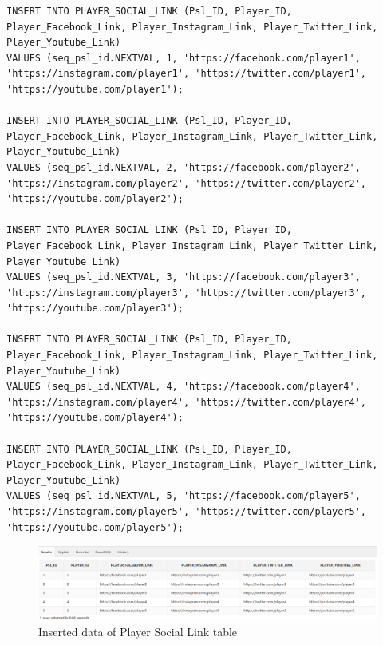\begin{lstlisting}[caption={Inserting data into Player\_SocialLink tables},label={lst:insert_Player_SocialLink}]
INSERT INTO PLAYER_SOCIAL_LINK (Psl_ID, Player_ID, Player_Facebook_Link, Player_Instagram_Link, Player_Twitter_Link, Player_Youtube_Link)
VALUES (seq_psl_id.NEXTVAL, 1, 'https://facebook.com/player1', 'https://instagram.com/player1', 'https://twitter.com/player1', 'https://youtube.com/player1');

INSERT INTO PLAYER_SOCIAL_LINK (Psl_ID, Player_ID, Player_Facebook_Link, Player_Instagram_Link, Player_Twitter_Link, Player_Youtube_Link)
VALUES (seq_psl_id.NEXTVAL, 2, 'https://facebook.com/player2', 'https://instagram.com/player2', 'https://twitter.com/player2', 'https://youtube.com/player2');

INSERT INTO PLAYER_SOCIAL_LINK (Psl_ID, Player_ID, Player_Facebook_Link, Player_Instagram_Link, Player_Twitter_Link, Player_Youtube_Link)
VALUES (seq_psl_id.NEXTVAL, 3, 'https://facebook.com/player3', 'https://instagram.com/player3', 'https://twitter.com/player3', 'https://youtube.com/player3');

INSERT INTO PLAYER_SOCIAL_LINK (Psl_ID, Player_ID, Player_Facebook_Link, Player_Instagram_Link, Player_Twitter_Link, Player_Youtube_Link)
VALUES (seq_psl_id.NEXTVAL, 4, 'https://facebook.com/player4', 'https://instagram.com/player4', 'https://twitter.com/player4', 'https://youtube.com/player4');

INSERT INTO PLAYER_SOCIAL_LINK (Psl_ID, Player_ID, Player_Facebook_Link, Player_Instagram_Link, Player_Twitter_Link, Player_Youtube_Link)
VALUES (seq_psl_id.NEXTVAL, 5, 'https://facebook.com/player5', 'https://instagram.com/player5', 'https://twitter.com/player5', 'https://youtube.com/player5');
\end{lstlisting}
\begin{figure}[H]
    \centering
    \includegraphics[width=1\textwidth]{images/TableData/PLAYER_SOCIAL_LINK.png}
    \caption{Inserted data of Player Social Link table}
\end{figure}

